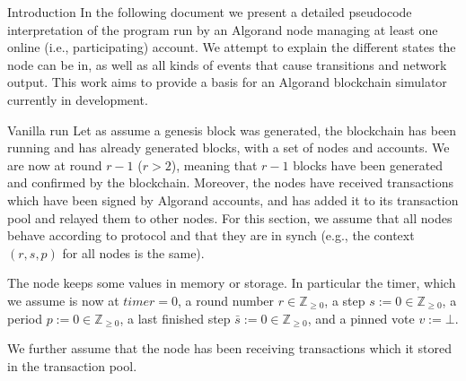 \documentclass[10pt,a4paper]{article}
\begin{document}
\begin{section}{Introduction}
In the following document we present a detailed pseudocode interpretation 
of the program run by an Algorand node managing at least one online (i.e., 
participating) account. We attempt to explain the different states the node 
can be in, as well as all kinds of events that cause transitions and network 
output. This work aims to provide a basis for an Algorand blockchain simulator 
currently in development. 

\begin{subsection}{Vanilla run}\label{subsect:vanilla-run}
Let as assume a genesis block was generated, the blockchain has been running and
has already generated blocks, with a set of nodes and accounts. 
We are now at round $r-1$ ($r>2$), meaning
that $r-1$ blocks have been generated and confirmed by the blockchain.
Moreover, the nodes have received transactions which have been signed 
by Algorand accounts, and has added it to its transaction pool and 
relayed them to other nodes.
For this section, we assume that all nodes behave according to protocol
and that they are in synch (e.g., the context $(r,s,p)$ for all nodes is 
the same).

The node keeps some values in memory or storage. In particular the 
timer, which we assume is now at $timer=0$,
a round number $r\in\mathbb{Z}_{\ge 0}$, 
a step $s:=0\in\mathbb{Z}_{\ge 0}$,
a period $p:=0\in\mathbb{Z}_{\ge 0}$, 
a last finished step $\bar{s}:=0\in\mathbb{Z}_{\ge 0}$, and 
a pinned vote $v:=\bot$.

We further assume that the node
has been receiving transactions which it stored in the transaction pool. 


\end{subsection}
\end{section}
\end{document}
